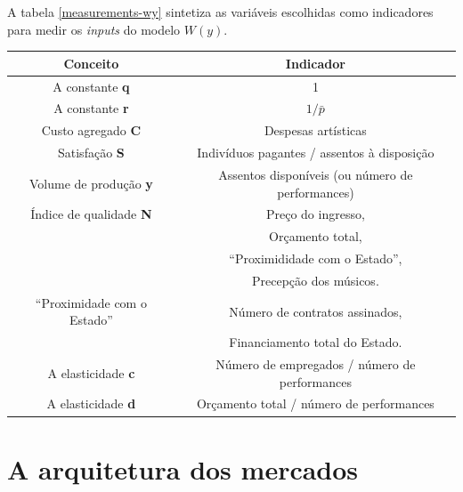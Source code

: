 \documentclass[a4paper, 12pt, openright, oneside, german, french, english, brazil]{abntex2}
\begin{document}
	A tabela \ref{measurements-wy} sintetiza as variáveis escolhidas como indicadores para medir os \textit{inputs} do modelo $W(y)$.
	
	\begin{table}
		{\begin{tabular}{|c|c|}
				
				\hline
				\textbf{Conceito} & \textbf{Indicador} \\
				\hline
				A constante \textbf{q} & 1 \\
				\hline
				A constante \textbf{r} &  $1/\bar{p}$ \\
				\hline
				Custo agregado \textbf{C} & Despesas artísticas \\
				\hline
				Satisfação \textbf{S} & Indivíduos pagantes / assentos à disposição \\
				\hline
				Volume de produção \textbf{y} & Assentos disponíveis (ou número de performances) \\
				\hline
				Índice de qualidade \textbf{N} & Preço do ingresso, \\
				& Orçamento total, \\
				& ``Proximididade com o Estado'', \\
				& Precepção dos músicos. \\
				\hline
				``Proximidade com o Estado'' & Número de contratos assinados, \\
				& Financiamento total do Estado. \\
				\hline
				A elasticidade \textbf{c} & Número de empregados / número de performances \\
				\hline
				A elasticidade \textbf{d} & Orçamento total / número de performances\\
				\hline
			\end{tabular}
		}
		{}
	\end{table}

	



	\section{A arquitetura dos mercados}
\end{document}
